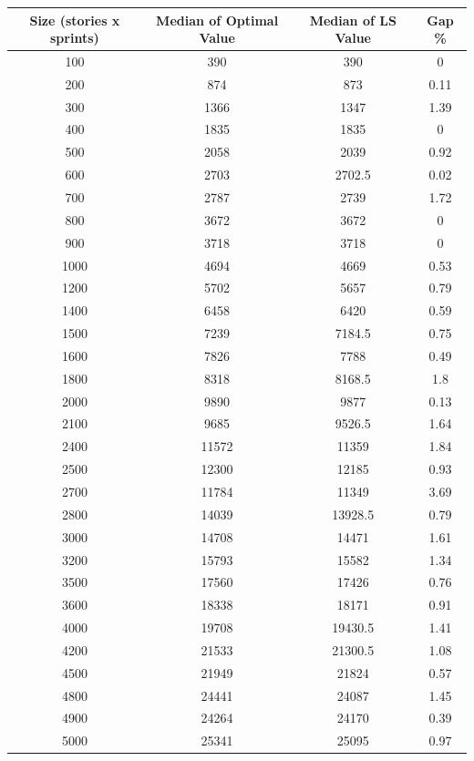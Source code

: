 \begin{table}[]
\begin{tabular}{|c|c|c|c|}
\hline
\textbf{Size (stories x sprints)} & \textbf{Median of Optimal Value} & \textbf{Median of LS Value} & \textbf{Gap \%} \\ \hline
100 & 390 & 390 & 0 \\ \hline
200 & 874 & 873 & 0.11 \\ \hline
300 & 1366 & 1347 & 1.39 \\ \hline
400 & 1835 & 1835 & 0 \\ \hline
500 & 2058 & 2039 & 0.92 \\ \hline
600 & 2703 & 2702.5 & 0.02 \\ \hline
700 & 2787 & 2739 & 1.72 \\ \hline
800 & 3672 & 3672 & 0 \\ \hline
900 & 3718 & 3718 & 0 \\ \hline
1000 & 4694 & 4669 & 0.53 \\ \hline
1200 & 5702 & 5657 & 0.79 \\ \hline
1400 & 6458 & 6420 & 0.59 \\ \hline
1500 & 7239 & 7184.5 & 0.75 \\ \hline
1600 & 7826 & 7788 & 0.49 \\ \hline
1800 & 8318 & 8168.5 & 1.8 \\ \hline
2000 & 9890 & 9877 & 0.13 \\ \hline
2100 & 9685 & 9526.5 & 1.64 \\ \hline
2400 & 11572 & 11359 & 1.84 \\ \hline
2500 & 12300 & 12185 & 0.93 \\ \hline
2700 & 11784 & 11349 & 3.69 \\ \hline
2800 & 14039 & 13928.5 & 0.79 \\ \hline
3000 & 14708 & 14471 & 1.61 \\ \hline
3200 & 15793 & 15582 & 1.34 \\ \hline
3500 & 17560 & 17426 & 0.76 \\ \hline
3600 & 18338 & 18171 & 0.91 \\ \hline
4000 & 19708 & 19430.5 & 1.41 \\ \hline
4200 & 21533 & 21300.5 & 1.08 \\ \hline
4500 & 21949 & 21824 & 0.57 \\ \hline
4800 & 24441 & 24087 & 1.45 \\ \hline
4900 & 24264 & 24170 & 0.39 \\ \hline
5000 & 25341 & 25095 & 0.97 \\ \hline

\end{tabular}
\end{table}

